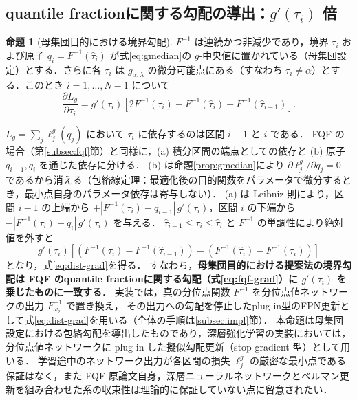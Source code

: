 \documentclass[a4paper,10pt]{jsarticle}
\makeatletter
\theoremstyle{definition}
\newtheorem{proposition}{命題}[section]
\renewenvironment{proof}[1][\proofname]{\par
  \pushQED{\qed}%
  \normalfont \topsep6\p@\@plus6\p@\relax
  \trivlist
  \item[\hskip\labelsep\textbf{#1}]\ignorespaces
}{%
  \popQED\endtrivlist\@endpefalse
}
\renewcommand{\proofname}{証明}
\newcommand{\Finv}{F^{-1}}
\makeatother
\begin{document}
\subsection{quantile fractionに関する勾配の導出：$g'(\tau_i)$ 倍}
\begin{proposition}[母集団目的における境界勾配]
\label{prop:grad}
$\Finv$ は連続かつ非減少であり，境界 $\tau_i$ および原子 $q_i=\Finv(\hat\tau_i)$ が式\eqref{eq:gmedian}の $g$-中央値に置かれている（母集団設定）とする．さらに各 $\tau_i$ は $g_{\alpha,\lambda}$ の微分可能点にある（すなわち $\tau_i\ne\alpha$）とする．このとき $i=1,\dots,N-1$ について
\begin{equation}
  \frac{\partial L_g}{\partial\tau_i}=g'(\tau_i)\left[2\Finv(\tau_i)-\Finv(\hat\tau_i)-\Finv(\hat\tau_{i-1})\right].
  \label{eq:dist-grad}
\end{equation}
\end{proposition}
\begin{proof}
$L_g=\sum_j\ell_j^g(q_j)$ において $\tau_i$ に依存するのは区間 $i-1$ と $i$ である．
FQF の場合（第\ref{subsec:fqf}節）と同様に，(a) 積分区間の端点としての依存と (b) 原子 $q_{i-1},q_i$ を通じた依存に分ける．
(b) は命題\ref{prop:gmedian}により $\partial\ell^g_j/\partial q_j=0$ であるから消える（包絡線定理：最適化後の目的関数をパラメータで微分するとき，最小点自身のパラメータ依存は寄与しない）．
(a) は Leibniz 則により，区間 $i-1$ の上端から $+|\Finv(\tau_i)-q_{i-1}|\,g'(\tau_i)$，区間 $i$ の下端から $-|\Finv(\tau_i)-q_i|\,g'(\tau_i)$ を与える．
$\hat\tau_{i-1}\le\tau_i\le\hat\tau_i$ と $\Finv$ の単調性により絶対値を外すと
\begin{equation*}
  g'(\tau_i)\left[\left(\Finv(\tau_i)-\Finv(\hat\tau_{i-1})\right)-\left(\Finv(\hat\tau_i)-\Finv(\tau_i)\right)\right]
\end{equation*}
となり，式\eqref{eq:dist-grad}を得る．
\end{proof}
すなわち，\textbf{母集団目的における提案法の境界勾配は FQF のquantile fractionに関する勾配（式\eqref{eq:fqf-grad}）に $g'(\tau_i)$ を乗じたものに一致する}．
実装では，真の分位点関数 $\Finv$ を分位点値ネットワークの出力 $\Finv_{\omega_2}$ で置き換え，
その出力への勾配を停止したplug-in型のFPN更新として式\eqref{eq:dist-grad}を用いる（全体の手順は\ref{subsec:impl}節）．
本命題は母集団設定における包絡勾配を導出したものであり，深層強化学習の実装においては，分位点値ネットワークに plug-in した擬似勾配更新（stop-gradient 型）として用いる．
学習途中のネットワーク出力が各区間の損失 $\ell_j^g$ の厳密な最小点である保証はなく，また FQF 原論文自身，深層ニューラルネットワークとベルマン更新を組み合わせた系の収束性は理論的に保証していない点に留意されたい．
\end{document}
